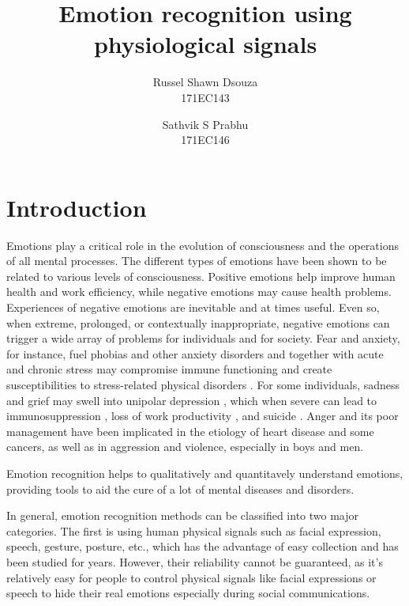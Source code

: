\documentclass[11pt]{article}
\title{\textbf{Emotion recognition using physiological signals}}
\author{
  Russel Shawn Dsouza\\
  171EC143
  \and
  Sathvik S Prabhu\\
  171EC146
}
\date{}
\theoremstyle{definition}
\begin{document}
  \maketitle

  \section{Introduction}
    Emotions play a critical role in the evolution of consciousness and the operations of all mental processes. The different types of emotions have been shown to be related to various levels of consciousness\cite{izard_emotion_2009}.
    Positive emotions help improve human health and work efficiency, while negative emotions may cause health problems.
    Experiences of negative emotions are inevitable and at times useful. 
    Even so, when extreme, prolonged, or contextually inappropriate, negative emotions can trigger a wide array of problems for individuals and for society. 
    Fear and anxiety, for instance, fuel phobias and other anxiety disorders \cite{ohman_automatic_1993} and together with acute and chronic stress may compromise immune functioning and create susceptibilities to stress-related physical disorders \cite{oleary_stress_1990}. 
    For some individuals, sadness and grief may swell into unipolar depression \cite{nolen-hoeksema_response_1993}, which when severe can lead to immunosuppression \cite{oleary_stress_1990}, loss of work productivity \cite{coryell_enduring_1993}, and suicide \cite{chen_lifetime_1996}. 
    Anger and its poor management have been implicated in the etiology of heart disease\cite{barefoot_hostility_1983, fredrickson_hostility_2000, scheier_person_1995} and some cancers\cite{eysenck_cancer_1994, greer_psychological_1975}, as well as in aggression and violence, especially in boys and men\cite{buss_evolution_2016, lemerise_development_2008}.

    Emotion recognition helps to qualitatively and quantitavely understand emotions, providing tools to aid the cure of a lot of mental diseases and disorders. 

    In general, emotion recognition methods can be classified into two major categories. 
    The first is using human physical signals such as facial expression, speech, gesture, posture, etc., which has the advantage of easy collection and has been studied for years. 
    However, their reliability cannot be guaranteed, as it’s relatively easy for people to control physical signals like facial expressions or speech to hide their real emotions especially during social communications.
\end{document}
